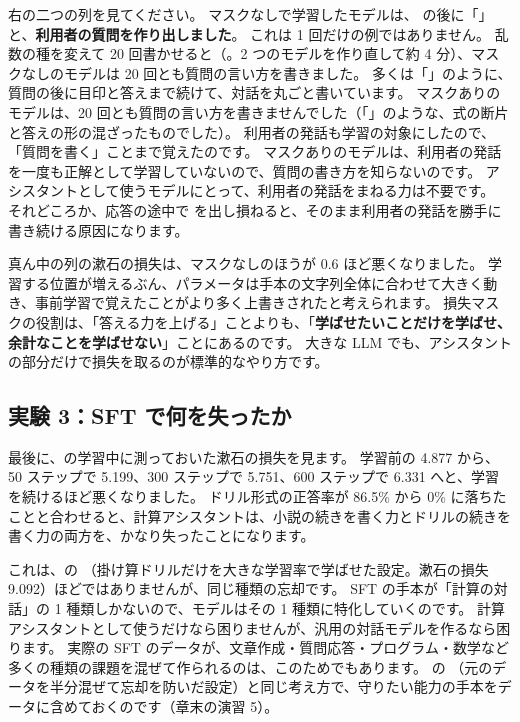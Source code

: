 右の二つの列を見てください。
マスクなしで学習したモデルは、 の後に「」と、\textbf{利用者の質問を作り出しました}。
これは 1 回だけの例ではありません。
乱数の種を変えて 20 回書かせると（。2 つのモデルを作り直して約 4 分）、マスクなしのモデルは 20 回とも質問の言い方を書きました。
多くは「」のように、質問の後に目印と答えまで続けて、対話を丸ごと書いています。
マスクありのモデルは、20 回とも質問の言い方を書きませんでした（「」のような、式の断片と答えの形の混ざったものでした）。
利用者の発話も学習の対象にしたので、「質問を書く」ことまで覚えたのです。
マスクありのモデルは、利用者の発話を一度も正解として学習していないので、質問の書き方を知らないのです。
アシスタントとして使うモデルにとって、利用者の発話をまねる力は不要です。
それどころか、応答の途中で  を出し損ねると、そのまま利用者の発話を勝手に書き続ける原因になります。

真ん中の列の漱石の損失は、マスクなしのほうが 0.6 ほど悪くなりました。
学習する位置が増えるぶん、パラメータは手本の文字列全体に合わせて大きく動き、事前学習で覚えたことがより多く上書きされたと考えられます。
損失マスクの役割は、「答える力を上げる」ことよりも、「\textbf{学ばせたいことだけを学ばせ、余計なことを学ばせない}」ことにあるのです。
大きな LLM でも、アシスタントの部分だけで損失を取るのが標準的なやり方です\cite{touvron2023llama2}。

\subsection{実験 3：SFT で何を失ったか}\label{sec:post-exp-forget}

最後に、の学習中に測っておいた漱石の損失を見ます。
学習前の 4.877 から、50 ステップで 5.199、300 ステップで 5.751、600 ステップで 6.331 へと、学習を続けるほど悪くなりました。
ドリル形式の正答率が 86.5\% から 0\% に落ちたことと合わせると、計算アシスタントは、小説の続きを書く力とドリルの続きを書く力の両方を、かなり失ったことになります。

これは、の （掛け算ドリルだけを大きな学習率で学ばせた設定。漱石の損失 9.092）ほどではありませんが、同じ種類の忘却です。
SFT の手本が「計算の対話」の 1 種類しかないので、モデルはその 1 種類に特化していくのです。
計算アシスタントとして使うだけなら困りませんが、汎用の対話モデルを作るなら困ります。
実際の SFT のデータが、文章作成・質問応答・プログラム・数学など多くの種類の課題を混ぜて作られる\cite{lambert2024tulu3}のは、このためでもあります。
の （元のデータを半分混ぜて忘却を防いだ設定）と同じ考え方で、守りたい能力の手本をデータに含めておくのです（章末の演習 5）。


